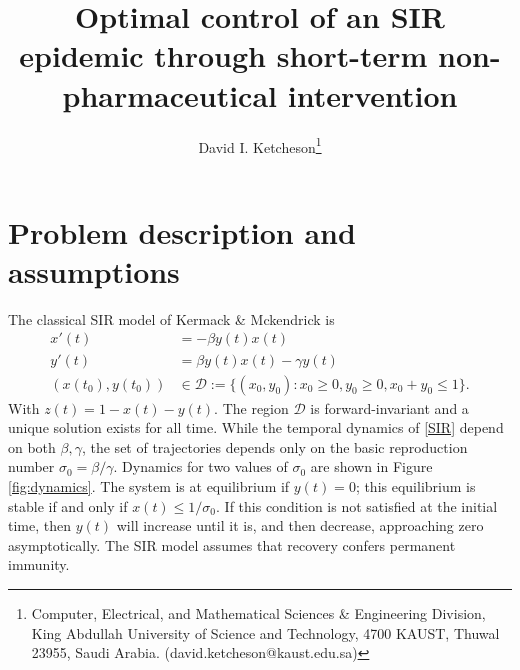 \documentclass[english,12pt]{article}
\newcommand{\Rnot}{\sigma_0}
\newcommand{\dom}{{\mathcal D}}
\begin{document}
\title{Optimal control of an SIR epidemic through short-term non-pharmaceutical intervention}
\author{
  David I. Ketcheson\thanks{Computer, Electrical, and Mathematical Sciences \& Engineering Division,
King Abdullah University of Science and Technology, 4700 KAUST, Thuwal
23955, Saudi Arabia. (david.ketcheson@kaust.edu.sa)}
}
\maketitle


\section{Problem description and assumptions}
The classical SIR model of Kermack \& Mckendrick \cite{} is
\begin{subequations} \label{SIR}
\begin{align} 
    x'(t) & = -\beta y(t) x(t) \label{eq:x} \\
    y'(t) & = \beta y(t) x(t) - \gamma y(t) \label{eq:y} \\
    (x(t_0),y(t_0)) & \in \dom := \{(x_0,y_0) : x_0 \ge 0, y_0\ge 0, x_0+y_0 \le 1\}.
\end{align}
\end{subequations}
With $z(t)=1-x(t)-y(t)$.  The region $\dom$ is forward-invariant
and a unique solution exists for all time.  While the temporal
dynamics of \eqref{SIR} depend on both $\beta,\gamma$, the set
of trajectories depends only on the basic reproduction number 
$\Rnot = \beta/\gamma$.  Dynamics for two values of $\Rnot$ are
shown in Figure \ref{fig:dynamics}.  The system
is at equilibrium if $y(t)=0$; this equilibrium is stable if and
only if $x(t)\le 1/\Rnot$.  If this condition is not satisfied at
the initial time, then $y(t)$ will increase until it is, and then decrease,
approaching zero asymptotically.  The SIR model assumes that recovery
confers permanent immunity.
\end{document}
